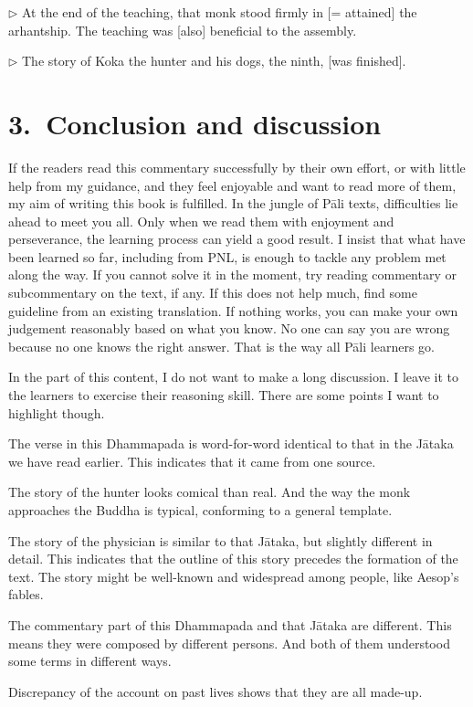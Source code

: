 \addtocounter{sennum}{-1}
$\triangleright$  At the end of the teaching, that monk stood firmly in [= attained] the arhantship. The teaching was [also] beneficial to the assembly.\\


\addtocounter{sennum}{-1}
$\triangleright$  The story of Koka the hunter and his dogs, the ninth, [was finished].\\

{}
\section*{3.\ Conclusion and discussion}

If the readers read this commentary successfully by their own effort, or with little help from my guidance, and they feel enjoyable and want to read more of them, my aim of writing this book is fulfilled. In the jungle of P\=ali texts, difficulties lie ahead to meet you all. Only when we read them with enjoyment and perseverance, the learning process can yield a good result. I insist that what have been learned so far, including from PNL, is enough to tackle any problem met along the way. If you cannot solve it in the moment, try reading commentary or subcommentary on the text, if any. If this does not help much, find some guideline from an existing translation. If nothing works, you can make your own judgement reasonably based on what you know. No one can say you are wrong because no one knows the right answer. That is the way all P\=ali learners go.

In the part of this content, I do not want to make a long discussion. I leave it to the learners to exercise their reasoning skill. There are some points I want to highlight though.

\begin{compactenum}[(1)]
\item The verse in this Dhammapada is word-for-word identical to that in the J\=ataka we have read earlier. This indicates that it came from one source.
\item The story of the hunter looks comical than real. And the way the monk approaches the Buddha is typical, conforming to a general template.
\item The story of the physician is similar to that J\=ataka, but slightly different in detail. This indicates that the outline of this story precedes the formation of the text. The story might be well-known and widespread among people, like Aesop's fables.
\item The commentary part of this Dhammapada and that J\=ataka are different. This means they were composed by different persons. And both of them understood some terms in different ways.
\item Discrepancy of the account on past lives shows that they are all made-up.
\end{compactenum}

